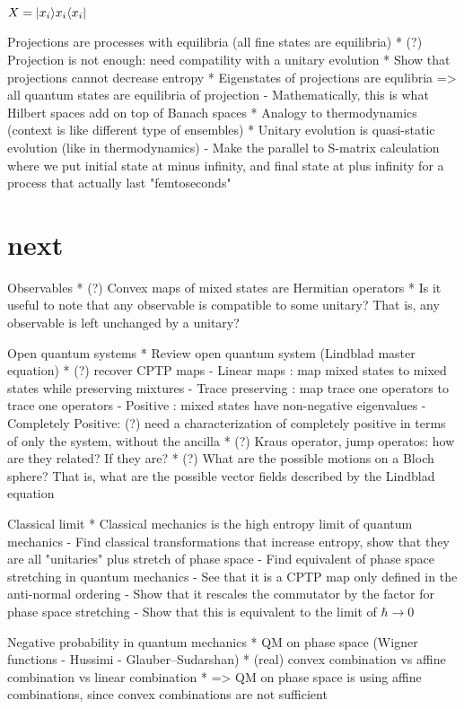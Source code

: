 $X = |x_i\rangle x_i \langle x_i|$


Projections are processes with equilibria (all fine states are equilibria)
* (?) Projection is not enough: need compatility with a unitary evolution
* Show that projections cannot decrease entropy
* Eigenstates of projections are equlibria => all quantum states are equilibria of projection
  - Mathematically, this is what Hilbert spaces add on top of Banach spaces
* Analogy to thermodynamics (context is like different type of ensembles)
* Unitary evolution is quasi-static evolution (like in thermodynamics)
  - Make the parallel to S-matrix calculation where we put initial state at minus infinity, and final state at plus infinity for a process that actually last "femtoseconds"
  
\section{next}

Observables
* (?) Convex maps of mixed states are Hermitian operators
* Is it useful to note that any observable is compatible to some unitary? That is, any observable is left unchanged by a unitary?

Open quantum systems
* Review open quantum system (Lindblad master equation)
* (?) recover CPTP maps 
- Linear maps : map mixed states to mixed states while preserving mixtures
- Trace preserving : map trace one operators to trace one operators
- Positive : mixed states have non-negative eigenvalues
- Completely Positive: (?) need a characterization of completely positive in terms of only the system, without the ancilla
* (?) Kraus operator, jump operatos: how are they related? If they are?
* (?) What are the possible motions on a Bloch sphere? That is, what are the possible vector fields described by the Lindblad equation

Classical limit
* Classical mechanics is the high entropy limit of quantum mechanics
- Find classical transformations that increase entropy, show that they are all "unitaries" plus stretch of phase space
- Find equivalent of phase space stretching in quantum mechanics
- See that it is a CPTP map only defined in the anti-normal ordering
- Show that it rescales the commutator by the factor for phase space stretching
- Show that this is equivalent to the limit of $\hbar \to 0$

Negative probability in quantum mechanics
* QM on phase space (Wigner functions - Hussimi - Glauber–Sudarshan)
* (real) convex combination vs affine combination vs linear combination
* => QM on phase space is using affine combinations, since convex combinations are not sufficient

